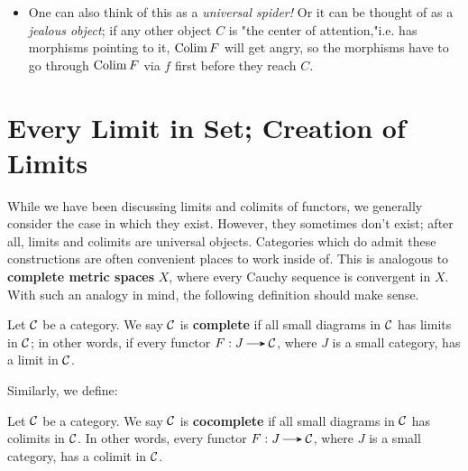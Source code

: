 \begin{itemize}
        \item One can also think of this as a 
        \textcolor{NavyBlue}{\textit{universal spider!}} 
        Or it can be thought of as a 
        \textcolor{NavyBlue}{\textit{jealous object}}; if any other
        object $C$ is "the center of attention,"i.e. has morphisms 
        pointing to it, $\operatorname*{\mathrm{Colim }} F$ will get
        angry, so the morphisms have to go through $\operatorname*{\mathrm{Colim }} F$ via $f$ 
        first before they reach $C$.
        \begin{center}
        \end{center}
    \end{itemize}

    \newpage
    \section{Every Limit in Set; Creation of Limits}
    
    While we have been discussing limits and colimits of functors, we generally 
    consider the case in which they exist. However, they sometimes don't exist; after all, 
    limits and colimits are universal objects. 
    Categories which do admit 
    these constructions are  often convenient places to work inside of.  
    This is analogous to \textbf{complete metric spaces} $X$,  
    where  every Cauchy sequence is convergent in $X$. With such an 
    analogy in  mind, the following definition should make sense.

    \begin{definition}
        Let $\mathcal{C}$ be a category. We say $\mathcal{C}$ is \textbf{complete} if
        all small diagrams in $\mathcal{C}$ has limits in $\mathcal{C}$; in other words, 
        if every functor $F: J \to \cc$, where $J$ is a small 
        category, has a limit in $\mathcal{C}$.  
    \end{definition}
    Similarly, we define:       
    \begin{definition}
        Let $\mathcal{C}$ be a category. We say $\mathcal{C}$ is \textbf{cocomplete}
        if all small diagrams in $\mathcal{C}$ has colimits in $\mathcal{C}$. In other words, 
        every functor $F: J \to \cc$, where $J$ is a small category, 
        has a colimit in $\mathcal{C}$.
    \end{definition}

